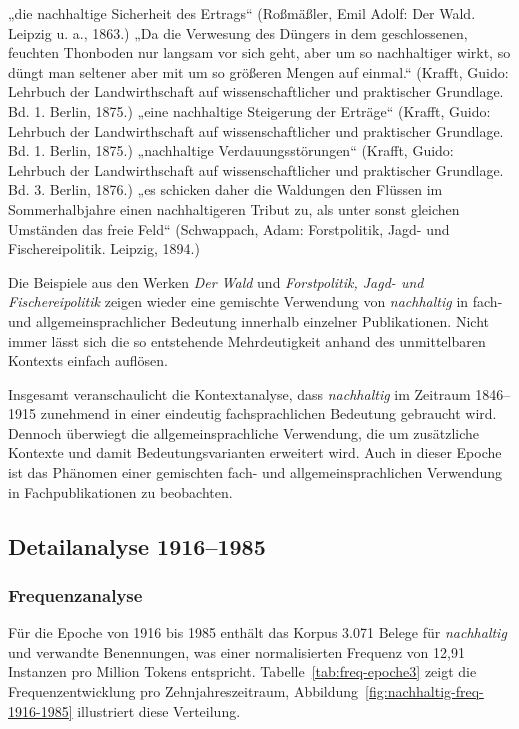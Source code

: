 \documentclass[
    german,
    a4paper,%
    12pt,%
    oneside,%
    toc=bibliography,
    final,
]{scrartcl}
\begin{document}
\begin{exe}
\ex \label{ex-1846-1915-forst-allg-1} „die nachhaltige Sicherheit des Ertrags“ (Roßmäßler, Emil Adolf: Der Wald. Leipzig u. a., 1863.)
\ex „Da die Verwesung des Düngers in dem geschlossenen, feuchten Thonboden nur langsam vor sich geht, aber um so nachhaltiger wirkt, so düngt man seltener aber mit um so größeren Mengen auf einmal.“ (Krafft, Guido: Lehrbuch der Landwirthschaft auf wissenschaftlicher und praktischer Grundlage. Bd. 1. Berlin, 1875.)
\ex „eine nachhaltige Steigerung der Erträge“ (Krafft, Guido: Lehrbuch der Landwirthschaft auf wissenschaftlicher und praktischer Grundlage. Bd. 1. Berlin, 1875.)
\ex „nachhaltige Verdauungsstörungen“ (Krafft, Guido: Lehrbuch der Landwirthschaft auf wissenschaftlicher und praktischer Grundlage. Bd. 3. Berlin, 1876.)
\ex \label{ex-1846-1915-forst-allg-n} „es schicken daher die Waldungen den Flüssen im Sommerhalbjahre einen nachhaltigeren Tribut zu, als unter sonst gleichen Umständen das freie Feld“ (Schwappach, Adam: Forstpolitik, Jagd- und Fischereipolitik. Leipzig, 1894.)
\end{exe}

Die Beispiele aus den Werken \textit{Der Wald} und \textit{Forstpolitik, Jagd- und Fischereipolitik} zeigen wieder eine gemischte Verwendung von \textit{nachhaltig} in fach- und allgemeinsprachlicher Bedeutung innerhalb einzelner Publikationen. Nicht immer lässt sich die so entstehende Mehrdeutigkeit anhand des unmittelbaren Kontexts einfach auflösen.

Insgesamt veranschaulicht die Kontextanalyse, dass \textit{nachhaltig} im Zeitraum 1846–1915 zunehmend in einer eindeutig fachsprachlichen Bedeutung gebraucht wird. Dennoch überwiegt die allgemeinsprachliche Verwendung, die um zusätzliche Kontexte und damit Bedeutungsvarianten erweitert wird. Auch in dieser Epoche ist das Phänomen einer gemischten fach- und allgemeinsprachlichen Verwendung in Fachpublikationen zu beobachten.


\subsection{Detailanalyse 1916–1985}
\label{subsec:detail-1916–1985}

\subsubsection{Frequenzanalyse}

Für die Epoche von 1916 bis 1985 enthält das Korpus 3.071 Belege für \textit{nachhaltig} und verwandte Benennungen, was einer normalisierten Frequenz von 12,91 Instanzen pro Million Tokens entspricht. Tabelle~\ref{tab:freq-epoche3} zeigt die Frequenzentwicklung pro Zehnjahreszeitraum, Abbildung~\ref{fig:nachhaltig-freq-1916-1985} illustriert diese Verteilung.
\end{document}
